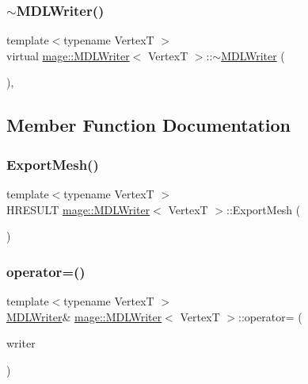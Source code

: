 \subsubsection{\texorpdfstring{$\sim$\+M\+D\+L\+Writer()}{~MDLWriter()}}
{\footnotesize\ttfamily template$<$typename VertexT $>$ \\
virtual \hyperlink{classmage_1_1_m_d_l_writer}{mage\+::\+M\+D\+L\+Writer}$<$ VertexT $>$\+::$\sim$\hyperlink{classmage_1_1_m_d_l_writer}{M\+D\+L\+Writer} (\begin{DoxyParamCaption}{ }\end{DoxyParamCaption})\hspace{0.3cm}{\ttfamily [virtual]}, {\ttfamily [default]}}



\subsection{Member Function Documentation}
\hypertarget{classmage_1_1_m_d_l_writer_ae749244a6528ab81600a62e95e73a44a}{}\label{classmage_1_1_m_d_l_writer_ae749244a6528ab81600a62e95e73a44a} 
\subsubsection{\texorpdfstring{Export\+Mesh()}{ExportMesh()}}
{\footnotesize\ttfamily template$<$typename VertexT $>$ \\
H\+R\+E\+S\+U\+LT \hyperlink{classmage_1_1_m_d_l_writer}{mage\+::\+M\+D\+L\+Writer}$<$ VertexT $>$\+::Export\+Mesh (\begin{DoxyParamCaption}{ }\end{DoxyParamCaption})\hspace{0.3cm}{\ttfamily [private]}}

\hypertarget{classmage_1_1_m_d_l_writer_ac8f4db1bc43a8fe4842409671505b49b}{}\label{classmage_1_1_m_d_l_writer_ac8f4db1bc43a8fe4842409671505b49b} 
\subsubsection{\texorpdfstring{operator=()}{operator=()}\hspace{0.1cm}{\footnotesize\ttfamily [1/2]}}
{\footnotesize\ttfamily template$<$typename VertexT $>$ \\
\hyperlink{classmage_1_1_m_d_l_writer}{M\+D\+L\+Writer}\& \hyperlink{classmage_1_1_m_d_l_writer}{mage\+::\+M\+D\+L\+Writer}$<$ VertexT $>$\+::operator= (\begin{DoxyParamCaption}\item[{const \hyperlink{classmage_1_1_m_d_l_writer}{M\+D\+L\+Writer}$<$ VertexT $>$ \&}]{writer }\end{DoxyParamCaption})\hspace{0.3cm}{\ttfamily [delete]}}

